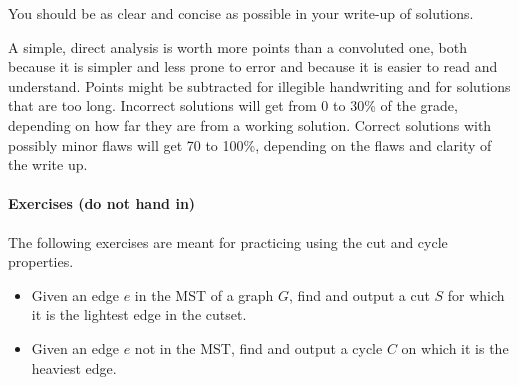 \documentclass[letterpaper,11pt]{article}
\begin{document}
You should be as clear and concise as possible in your write-up of
solutions. 

A simple, direct analysis is worth more points than a
convoluted one, both because it is simpler and less prone to error and
because it is easier to read and understand. Points might be
subtracted for illegible handwriting and for solutions that are too
long. Incorrect solutions will get from 0 to 30\% of the grade,
depending on how far they are from a working solution. Correct
solutions with possibly minor flaws will get 70 to 100\%, depending on
the flaws and clarity of the write up.

\paragraph{Exercises (do not hand in)}
The following exercises are meant for practicing using the cut and cycle properties.

\begin{itemize}
    \item Given an edge $e$ in the MST of a graph $G$, find and output a cut $S$ for which it is the lightest edge in the cutset.
    \item Given an edge $e$ not in the MST, find and output a cycle $C$ on which it is the heaviest edge.
\end{itemize}
\end{document}
